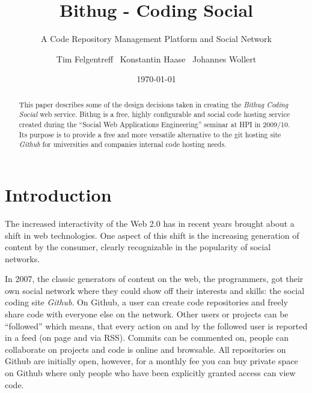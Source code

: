 \documentclass{llncs}
\begin{document}
\pagestyle{headings}  %
\mainmatter %
\title{Bithug - Coding Social}
\subtitle{A Code Repository Management Platform and Social Network}
\author{Tim Felgentreff~ Konstantin Haase~ Johannes Wollert}
\date{\today}

\maketitle
\begin{abstract}
  This paper describes some of the design decisions taken in creating
  the \emph{Bithug Coding Social} web service. Bithug is a free, highly 
  configurable and social code hosting service created during the ``Social 
  Web Applications Engineering'' seminar at HPI in 2009/10. Its purpose is to 
  provide a free and more versatile alternative to the git hosting 
  site \emph{Github} for universities and companies internal code hosting needs.
\end{abstract}
\section{Introduction}
The increased interactivity of the Web 2.0 has in recent years brought about a 
shift in web technologies. One aspect of this shift is the increasing generation
of content by the consumer, clearly recognizable in the popularity of social 
networks.

In 2007, the classic generators of content on the web, the programmers, got 
their own social network where they could show off their interests and skills: 
the social coding site \emph{Github}\cite{github:www}. On Github, a user can 
create code repositories and freely share code with everyone else on the network.
Other users or projects can be ``followed'' which means, that every action on 
and by the followed user is reported in a feed (on page and via RSS). Commits
can be commented on, people can collaborate on projects and code is online and 
browsable.
All repositories on Github are initially open, however, for a monthly fee you 
can buy private space on Github where only people who have been explicitly 
granted access can view code.
\end{document}

